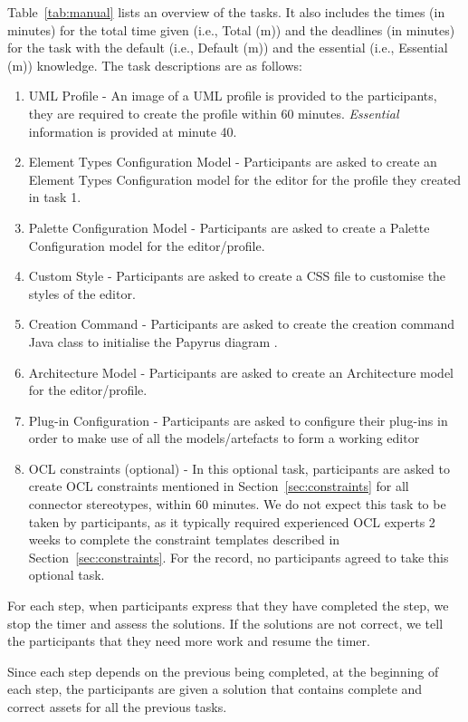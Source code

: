 Table~\ref{tab:manual} lists an overview of the tasks. It also includes the times (in minutes) for the total time given (i.e., Total (m))  and the deadlines (in minutes) for the task with the default (i.e., Default (m)) and the essential (i.e., Essential (m)) knowledge.
The task descriptions are as follows:
\begin{enumerate}
	\item UML Profile - An image of a UML profile is provided to the participants, they are required to create the profile within 60 minutes.
	\textit{Essential} information is provided at minute 40.
	\item Element Types Configuration Model - Participants are asked to create an Element Types Configuration model for the editor for the profile they created in task 1.
	\item Palette Configuration Model - Participants are asked to create a Palette Configuration model for the editor/profile.
	\item Custom Style - Participants are asked to create a CSS file to customise the styles of the editor.
	\item Creation Command - Participants are asked to create the creation command Java class to initialise the Papyrus diagram .
	\item Architecture Model - Participants are asked to create an Architecture model for the editor/profile.
	\item Plug-in Configuration - Participants are asked to configure their plug-ins in order to make use of all the models/artefacts to form a working editor
	\item OCL constraints (optional) - In this optional task, participants are asked to create OCL constraints mentioned in Section~\ref{sec:constraints} for all connector stereotypes, within 60 minutes. 
	We do not expect this task to be taken by participants, as it typically required experienced OCL experts 2 weeks to complete the constraint templates described in Section~\ref{sec:constraints}.
	For the record, no participants agreed to take this optional task.
\end{enumerate}

For each step, when participants express that they have completed the step, we stop the timer and assess the solutions. 
If the solutions are not correct, we tell the participants that they need more work and resume the timer. 

Since each step depends on the previous being completed, at the beginning of each step, the participants are given a solution that contains complete and correct assets for all the previous tasks.

